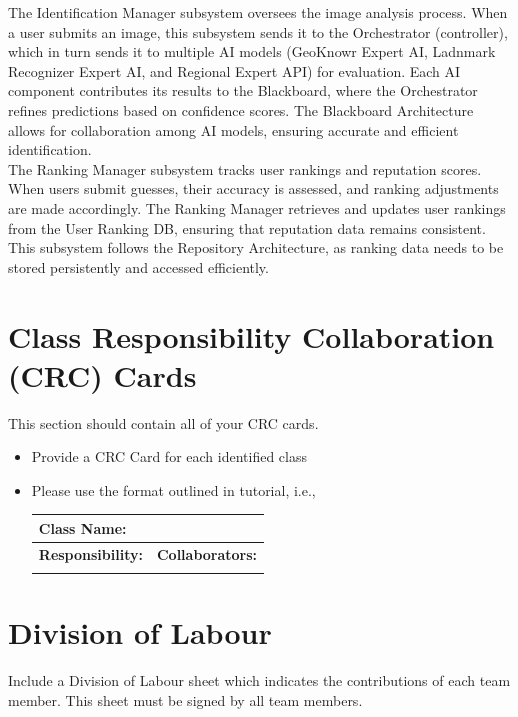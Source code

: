 \documentclass[]{article}
\begin{document}
\noindent The Identification Manager subsystem oversees the image analysis process. When a user submits an image, this subsystem sends it to the Orchestrator (controller), which in turn sends it to multiple AI models (GeoKnowr Expert AI, Ladnmark Recognizer Expert AI, and Regional Expert API) for evaluation. Each AI component contributes its results to the Blackboard, where the Orchestrator refines predictions based on confidence scores. The Blackboard Architecture allows for collaboration among AI models, ensuring accurate and efficient identification. \\

\noindent The Ranking Manager subsystem tracks user rankings and reputation scores. When users submit guesses, their accuracy is assessed, and ranking adjustments are made accordingly. The Ranking Manager retrieves and updates user rankings from the User Ranking DB, ensuring that reputation data remains consistent. This subsystem follows the Repository Architecture, as ranking data needs to be stored persistently and accessed efficiently.

	
\section{Class Responsibility Collaboration (CRC) Cards}
\label{sec:class_responsibility_collaboration_crc_cards}
This section should contain all of your CRC cards.

\begin{itemize}
	\item Provide a CRC Card for each identified class
	\item Please use the format outlined in tutorial, i.e.,
	\begin{table}[ht]
		\centering
		\begin{tabular}{|p{5cm}|p{5cm}|}
		\hline 
		 \multicolumn{2}{|l|}{\textbf{Class Name:}} \\
		\hline
		\textbf{Responsibility:} & \textbf{Collaborators:} \\
		\hline
		\vspace{1in} & \\
		\hline
		\end{tabular}
	\end{table}
	
\end{itemize}

\appendix
\section{Division of Labour}
\label{sec:division_of_labour}
Include a Division of Labour sheet which indicates the contributions of each team member. This sheet must be signed by all team members.
\end{document}
